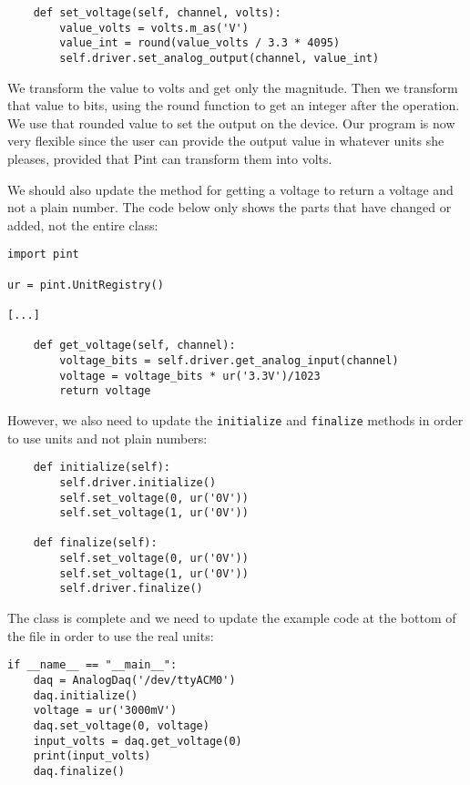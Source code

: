 \begin{verbatim}
    def set_voltage(self, channel, volts):
        value_volts = volts.m_as('V')
        value_int = round(value_volts / 3.3 * 4095)
        self.driver.set_analog_output(channel, value_int)
\end{verbatim}

We transform the value to volts and get only the magnitude. Then we transform that value to bits, using the round function to get an integer after the operation. We use that rounded value to set the output on the device. Our program is now very flexible since the user can provide the output value in whatever units she pleases, provided that Pint can transform them into volts.


We should also update the method for getting a voltage to return a voltage and not a plain number. The code below only shows the parts that have changed or added, not the entire class:

\begin{verbatim}
import pint

ur = pint.UnitRegistry()

[...]

    def get_voltage(self, channel):
        voltage_bits = self.driver.get_analog_input(channel)
        voltage = voltage_bits * ur('3.3V')/1023
        return voltage
\end{verbatim}

However, we also need to update the \texttt{initialize} and \texttt{finalize} methods in order to use units and not plain numbers:

\begin{verbatim}
    def initialize(self):
        self.driver.initialize()
        self.set_voltage(0, ur('0V'))
        self.set_voltage(1, ur('0V'))

    def finalize(self):
        self.set_voltage(0, ur('0V'))
        self.set_voltage(1, ur('0V'))
        self.driver.finalize()
\end{verbatim}

The class is complete and we need to update the example code at the bottom of the file in order to use the real units:

\begin{verbatim}
if __name__ == "__main__":
    daq = AnalogDaq('/dev/ttyACM0')
    daq.initialize()
    voltage = ur('3000mV')
    daq.set_voltage(0, voltage)
    input_volts = daq.get_voltage(0)
    print(input_volts)
    daq.finalize()
\end{verbatim}

